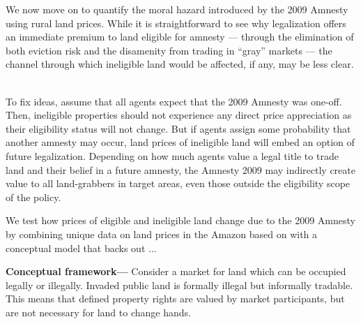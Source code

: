 \documentclass[12pt]{article}
\newcommand{\PTR}[1]{{\color{blue}{#1}}}
\begin{document}
\quad We now move on to quantify the moral hazard introduced by the 2009 Amnesty using rural land prices. While it is straightforward to see why legalization offers an immediate premium to land eligible for amnesty --- through the elimination of both eviction risk and the disamenity from trading in ``gray'' markets --- the channel through which ineligible land would be affected, if any, may be less clear. 
\ 

\quad To fix ideas, assume that all agents expect that the 2009 Amnesty was one-off. Then, ineligible properties should not experience any direct price appreciation as their eligibility status will not change. But if agents assign some probability that another amnesty may occur, land prices of ineligible land will embed an option of future legalization. Depending on how much agents value a legal title to trade land and their belief in a future amnesty, the Amnesty 2009 may indirectly create value to all land-grabbers in target areas, even those outside the eligibility scope of the policy.
\

\quad We test how prices of eligible and ineligible land change due to the 2009 Amnesty by combining unique data on land prices in the Amazon based on with a conceptual model that backs out ... 
\ 

\quad \textbf{Conceptual framework---} Consider a market for land which can be occupied legally or illegally. Invaded public land is formally illegal but informally tradable. This means that defined property rights are valued by market participants, but are not necessary for land to change hands. %
\ 
\end{document}

